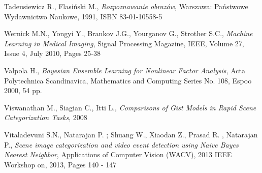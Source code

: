 \begin{thebibliography}{100}
 Tadeusiewicz R., Flasiński M., \emph{Rozpoznawanie obrazów}, Warszawa: Państwowe Wydawnictwo Naukowe, 1991, ISBN 83-01-10558-5

 Wernick M.N., Yongyi Y., Brankov J.G., Yourganov G., Strother S.C., \emph{Machine Learning in Medical Imaging}, Signal Processing Magazine, IEEE, Volume 27,  Issue 4, July 2010, Pages 25-38

 Valpola H., \emph{Bayesian Ensemble Learning for Nonlinear Factor Analysis}, Acta Polytechnica Scandinavica, Mathematics and Computing Series No. 108, Espoo 2000, 54 pp.

  Viswanathan M., Siagian C., Itti L., \emph{Comparisons of Gist Models in Rapid Scene Categorization Tasks}, 2008

 Vitaladevuni S.N., Natarajan P. ; Shuang W., Xiaodan Z., Prasad R. , Natarajan P., \emph{Scene image categorization and video event detection using Naive Bayes Nearest Neighbor}, Applications of Computer Vision (WACV), 2013 IEEE Workshop on, 2013, Pages 140 - 147
 
\end{thebibliography} 